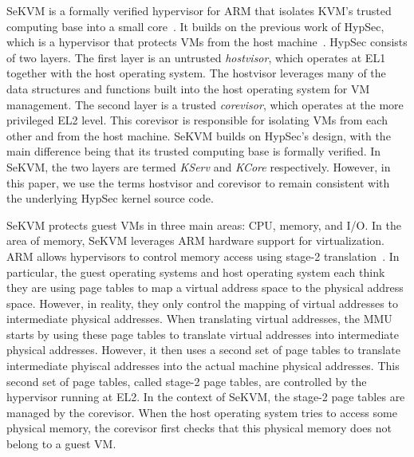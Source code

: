 SeKVM is a formally verified hypervisor for ARM that isolates KVM's trusted computing
base into a small core~\cite{sekvm}. It builds on the previous work of HypSec,
which is a hypervisor that protects VMs from the host machine~\cite{hypsec}.
HypSec consists of two layers. The first layer is an untrusted
\textit{hostvisor}, which operates at EL1 together with the host operating
system. The hostvisor leverages many of the data structures and functions
built into the host operating system for VM management. The second layer is a
trusted \textit{corevisor}, which operates at the more privileged EL2 level.
This corevisor is responsible for isolating VMs from each other and from the
host machine. SeKVM builds on HypSec's design, with the main difference being
that its trusted computing base is formally verified. In SeKVM, the two layers
are termed \textit{KServ} and \textit{KCore} respectively. However, in this
paper, we use the terms hostvisor and corevisor to remain
consistent with the underlying HypSec kernel source code.

SeKVM protects guest VMs in three main areas: CPU, memory, and I/O. In the
area of memory, SeKVM leverages ARM hardware support for virtualization. ARM
allows hypervisors to control memory access using stage-2
translation~\cite{arm}. In particular, the guest operating systems and host
operating system each think they are using page tables to map a virtual address space to the
physical address space. However, in reality, they only control the mapping
of virtual addresses to intermediate physical addresses. When translating
virtual addresses, the MMU starts by using these page tables to translate
virtual addresses into intermediate physical addresses. However, it then
uses a second set of page tables to translate
intermediate phyiscal addresses into the actual machine physical addresses.
This second set of page tables, called stage-2 page tables, are controlled by
the hypervisor running at EL2. In the context of SeKVM, the stage-2 page tables
are managed by the corevisor. When the host operating system tries to
access some physical memory, the corevisor first checks that this
physical memory does not belong to a guest VM.

